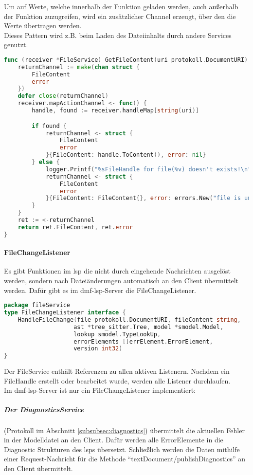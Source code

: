 \documentclass[./einleitung.tex]{subfiles}
\begin{document}
    Um auf Werte, welche innerhalb der Funktion geladen werden, auch außerhalb der Funktion zuzugreifen, wird ein zusätzlicher Channel erzeugt, über den die Werte übertragen werden.\\
    Dieses Pattern wird z.B. beim Laden des Dateiinhalts durch andere Services genutzt.
    \begin{lstlisting}[language=Go, captio=Laden eines FileHandles]
func (receiver *FileService) GetFileContent(uri protokoll.DocumentURI) (FileContent, error) {
	returnChannel := make(chan struct {
		FileContent
		error
	})
	defer close(returnChannel)
	receiver.mapActionChannel <- func() {
		handle, found := receiver.handleMap[string(uri)]

		if found {
			returnChannel <- struct {
				FileContent
				error
			}{FileContent: handle.ToContent(), error: nil}
		} else {
			logger.Printf("%sFileHandle for file(%v) doesn't exists!\n", logService.ERROR, uri)
			returnChannel <- struct {
				FileContent
				error
			}{FileContent: FileContent{}, error: errors.New("file is unknown")}
		}
	}
	ret := <-returnChannel
	return ret.FileContent, ret.error
}
    \end{lstlisting}

    \paragraph{FileChangeListener}
    Es gibt Funktionen im \acrshort{lsp} die nicht durch eingehende Nachrichten ausgelöst werden, sondern nach Dateiänderungen automatisch an den Client übermittelt werden.
    Dafür gibt es im \acrshort{dmf}-\acrshort{lsp}-Server die FileChangeListener.
    \begin{lstlisting}[language=Go]
package fileService
type FileChangeListener interface {
	HandleFileChange(file protokoll.DocumentURI, fileContent string,
                    ast *tree_sitter.Tree, model *smodel.Model,
                    lookup smodel.TypeLookUp,
                    errorElements []errElement.ErrorElement,
                    version int32)
}
    \end{lstlisting}
    Der FileService enthält Referenzen zu allen aktiven Listenern.
    Nachdem ein FileHandle erstellt oder bearbeitet wurde, werden alle Listener durchlaufen.\\
    Im \acrshort{dmf}-\acrshort{lsp}-Server ist nur ein FileChangeListener implementiert:
    \subparagraph[DiagnosticsService]{Der DiagnosticsService }\label{subsubsec:diagnostics-service}
    (Protokoll im Abschnitt \ref{subsubsec:diagnostics})
    übermittelt die aktuellen Fehler in der Modelldatei an den Client.
    Dafür werden alle ErrorElemente in die Diagnostic Strukturen des \acrshort{lsp}s übersetzt.
    Schließlich werden die Daten mithilfe einer Request-Nachricht für die Methode ``textDocument/publishDiagnostics'' an den Client übermittelt.
\end{document}
